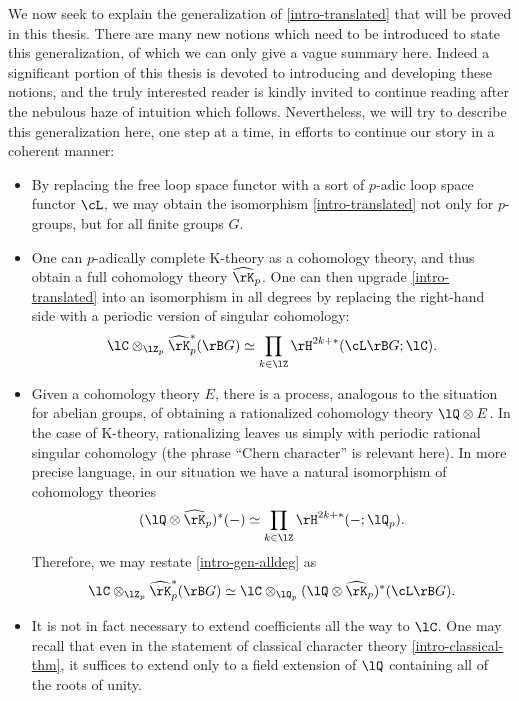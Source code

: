 We now seek to explain the generalization of \cref{intro-translated}
that will be proved in this thesis. There are many new notions which
need to be introduced to state this generalization, of which we can
only give a vague summary here. Indeed a significant portion of this
thesis is devoted to introducing and developing these notions, and the
truly interested reader is kindly invited to continue reading after
the nebulous haze of intuition which follows. Nevertheless, we will
try to describe this generalization here, one step at a time, in
efforts to continue our story in a coherent manner:

\begin{itemize}[leftmargin=*]
\item By replacing the free loop space functor with a sort of $p$-adic
  loop space functor $\cL$, we may obtain the isomorphism
  \cref{intro-translated} not only for $p$-groups, but for all finite
  groups $G$.

\item One can $p$-adically complete K-theory as a cohomology theory,
  and thus obtain a full cohomology theory $\hat\rK_p$. One can then
  upgrade \cref{intro-translated} into an isomorphism in all degrees
  by replacing the right-hand side with a periodic version of singular
  cohomology:
  \begin{equation}
    \label{intro-gen-alldeg}
      \lC \otimes_{\lZ_p} \hat\rK_p^*(\rB G) \iso
      \prod_{k \in \lZ} \rH^{2k+*}(\cL\rB G;\lC).
  \end{equation}

\item Given a cohomology theory $E$, there is a process, analogous to
  the situation for abelian groups, of obtaining a rationalized
  cohomology theory $\lQ \otimes E$. In the case of K-theory,
  rationalizing leaves us simply with periodic rational singular
  cohomology (the phrase ``Chern character'' is relevant here). In
  more precise language, in our situation we have a natural
  isomorphism of cohomology theories
  \[
  (\lQ \otimes \hat\rK_p)^*(-) \iso
  \prod_{k \in \lZ} \rH^{2k+*}(-;\lQ_p).
  \]
  Therefore, we may restate \cref{intro-gen-alldeg} as
  \begin{equation}
    \label{intro-gen-ratl}
    \lC \otimes_{\lZ_p} \hat\rK_p^*(\rB G) \iso
    \lC \otimes_{\lQ_p} (\lQ \otimes \hat\rK_p)^*(\cL\rB G).
  \end{equation}

\item It is not in fact necessary to extend coefficients all the way
  to $\lC$. One may recall that even in the statement of classical
  character theory \cref{intro-classical-thm}, it suffices to extend
  only to a field extension of $\lQ$ containing all of the roots of
  unity.


\end{itemize}
